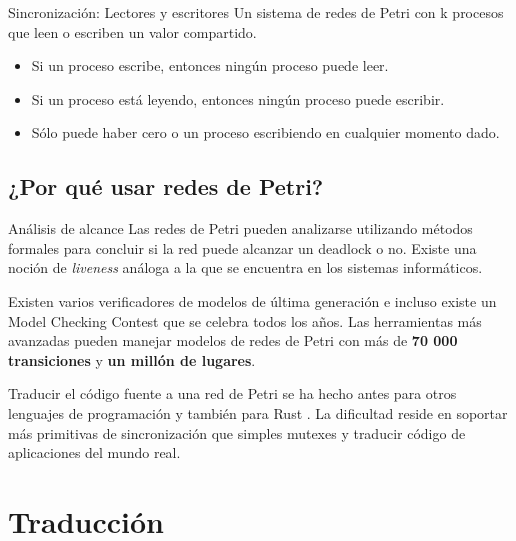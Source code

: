 \documentclass{beamer}
\begin{document}
\begin{frame}{Sincronización: Lectores y escritores}
  \scriptsize
  Un sistema de redes de Petri con k procesos que leen o escriben un valor compartido.

  \begin{itemize}
    \item Si un proceso escribe, entonces ningún proceso puede leer.
    \item Si un proceso está leyendo, entonces ningún proceso puede escribir.
    \item Sólo puede haber cero o un proceso escribiendo en cualquier momento dado.
  \end{itemize}

  \begin{figure}
    \centering
    
  \end{figure}
\end{frame}

\subsection{¿Por qué usar redes de Petri?}

\begin{frame}{Análisis de alcance}
  Las redes de Petri pueden analizarse utilizando métodos formales para concluir si la red puede alcanzar
  un deadlock o no. Existe una noción de \emph{liveness} análoga a la que se encuentra en los sistemas informáticos.
  
  \vfill
  \pause

  Existen varios verificadores de modelos de última generación e
  incluso existe un Model Checking Contest que se celebra todos los años.
  Las herramientas más avanzadas pueden manejar modelos de redes de Petri
  con más de \textbf{70 000 transiciones} y \textbf{un millón de lugares}.

  \vfill
  \pause

  Traducir el código fuente a una red de Petri se ha hecho antes para otros lenguajes de programación
  \cite{kavi2002modeling,moshtaghi2001} y también para Rust \cite{meyer2020, zhang2022deadlocks}.
  La dificultad reside en soportar más primitivas de sincronización
  que simples mutexes y traducir código de aplicaciones del mundo real.
\end{frame}

\section{Traducción}
\end{document}
